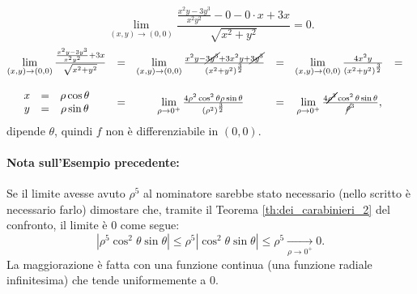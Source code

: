 \begin{example}
\begin{enumerate}
\begin{equation*}
	 		\lim_{(x,y)\rightarrow(0,0)}\frac{\frac{x^2y-3y^3}{x^2y^2}-0-0\cdot x + 3x}{\sqrt{x^2+y^2}} = 0.
	 	\end{equation*}
	 	\begin{equation*}
	 		\begin{matrix}
	 			\lim\limits_{(x,y) \rightarrow(0,0)}\frac{\frac{x^2y-3y^3}{x^2y^2}+ 3x}{\sqrt{x^2+y^2}} &=& \lim\limits_{(x,y) \rightarrow(0,0)} \frac{x^2y-\cancel{3y^3}+3x^2y+\cancel{3y^3}}{(x^2+y^2)^{\frac{3}{2}}} &=& \lim\limits_{(x,y) \rightarrow(0,0)}\frac{4x^2y}{(x^2+y^2)^{\frac{3}{2}}} &=&\\\\
	 			\begin{matrix}
	 				x&=&\rho\cos\theta\\
	 				y&=&\rho\sin\theta 
	 			\end{matrix}&=& \lim\limits_{\rho \rightarrow 0^+}\frac{4\rho^2\cos^2\theta\rho\sin\theta}{(\rho^2)^{\frac{3}{2}}} &=& \lim\limits_{\rho \rightarrow 0^+}\frac{4\cancel{\rho^3}\cos^2\theta\sin\theta}{\cancel{\rho}^3},
	 		\end{matrix}
	 	\end{equation*}
	 	dipende $\theta$, quindi $f$ non è differenziabile in $(0,0)$.
	 \end{enumerate}
\end{example}

\paragraph{Nota sull'Esempio precedente:} Se il limite avesse avuto $\rho^5$ al nominatore sarebbe stato necessario (nello scritto è necessario farlo) dimostare che, tramite il Teorema \ref{th:dei_carabinieri_2} del confronto, il limite è 0 come segue:
\begin{equation*}
	|\rho^5\cos^2\theta\sin\theta| \leq \rho^5 |\cos^2\theta\sin\theta|\leq \rho^5 \underset{\rho\rightarrow 0^+}{\rightarrow} 0.
\end{equation*}
La maggiorazione è fatta con una funzione continua (una funzione radiale infinitesima) che tende uniformemente a 0. 

